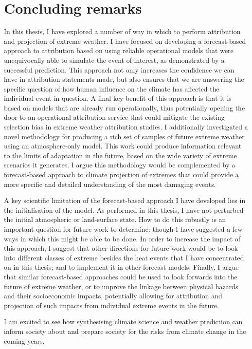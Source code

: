 \section{Concluding remarks}\label{discussion:remarks}

  In this thesis, I have explored a number of way in which to perform attribution and projection of extreme weather. I have focused on developing a forecast-based approach to attribution based on using reliable operational models that were unequivocally able to simulate the event of interest, as demonstrated by a successful prediction. This approach not only increases the confidence we can have in attribution statements made, but also ensures that we are answering the specific question of how human influence on the climate has affected the individual event in question. A final key benefit of this approach is that it is based on models that are already run operationally, thus potentially opening the door to an operational attribution service that could mitigate the existing selection bias in extreme weather attribution studies. I additionally investigated a novel methodology for producing a rich set of samples of future extreme weather using an atmosphere-only model. This work could produce information relevant to the limits of adaptation in the future, based on the wide variety of extreme scenarios it generates. I argue this methodology would be complemented by a forecast-based approach to climate projection of extremes that could provide a more specific and detailed understanding of the most damaging events. 

  A key scientific limitation of the forecast-based approach I have developed lies in the initialisation of the model. As performed in this thesis, I have not perturbed the initial atmospheric or land-surface state. How to do this robustly is an important question for future work to determine: though I have suggested a few ways in which this might be able to be done. In order to increase the impact of this approach, I suggest that other directions for future work would be to look into different classes of extreme besides the heat events that I have concentrated on in this thesis; and to implement it in other forecast models. Finally, I argue that similar forecast-based approaches could be used to look forwards into the future of extreme weather, or to improve the linkage between physical hazards and their socioeconomic impacts, potentially allowing for attribution and projection of such impacts from individual extreme events in the future.

  I am excited to see how synthesising climate science and weather prediction can inform society about and prepare society for the risks from climate change in the coming years.